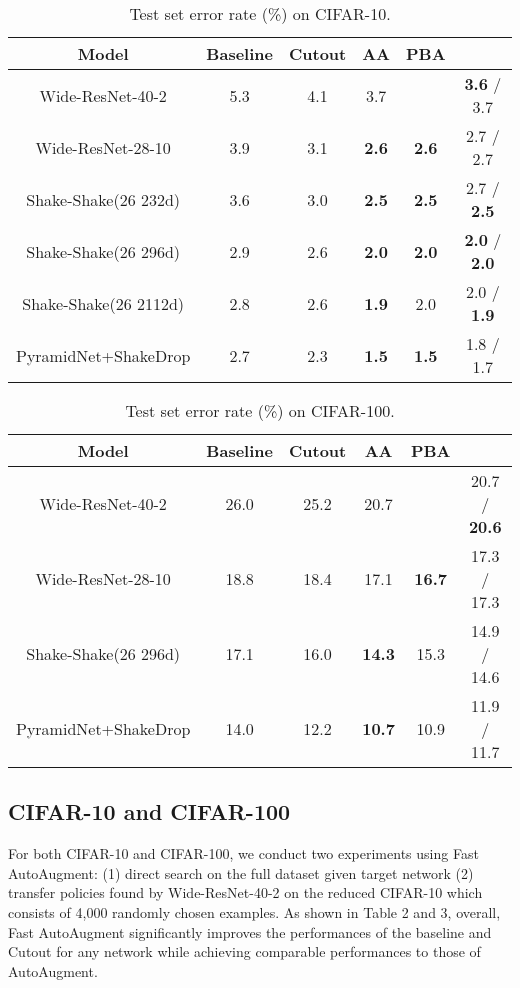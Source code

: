 \documentclass{article}
\begin{document}
\begin{table*}[t!] \center
\begin{tabular}{c | c c c c | c }
\toprule
Model & Baseline & Cutout \cite{devries2017cutout} & AA \cite{cubuk2018autoaugment} & PBA \cite{ho2019pba} &  
\tabularnewline
\midrule
Wide-ResNet-40-2 & 5.3 & 4.1 & 3.7 &  & \textbf{3.6} / 3.7 \\
Wide-ResNet-28-10 & 3.9 & 3.1 & {\bf 2.6} & \textbf{2.6} & 2.7 / 2.7 \\
Shake-Shake(26 232d) & 3.6 & 3.0 & {\bf 2.5} & \textbf{2.5} & 2.7 / \textbf{2.5} \\
Shake-Shake(26 296d) & 2.9 & 2.6 & {\bf 2.0} & \textbf{2.0} & \textbf{2.0} / {\bf 2.0} \\
Shake-Shake(26 2112d) & 2.8 & 2.6 & {\bf 1.9} & 2.0 & 2.0 / \textbf{1.9} \\
PyramidNet+ShakeDrop & 2.7 & 2.3 & {\bf 1.5} & \textbf{1.5} & 1.8 / 1.7
\tabularnewline
\bottomrule
\end{tabular}
\caption{Test set error rate (\%) on CIFAR-10.}
\label{table1:cifar10}
\end{table*}
\begin{table*}[t!] \center
\begin{tabular}{c | c c c c | c}
\toprule
Model & Baseline & Cutout \cite{devries2017cutout} & AA \cite{cubuk2018autoaugment} & PBA \cite{ho2019pba} &  
\tabularnewline
\midrule
Wide-ResNet-40-2 & 26.0 & 25.2 & 20.7 &  & 20.7 / \textbf{20.6} \\
Wide-ResNet-28-10 & 18.8 & 18.4 & 17.1 & \textbf{16.7} &  17.3 / 17.3 \\
Shake-Shake(26 296d) & 17.1 & 16.0 & {\bf 14.3} & 15.3 & 14.9 / 14.6 \\
PyramidNet+ShakeDrop & 14.0 & 12.2 & {\bf 10.7} & 10.9 & 11.9 / 11.7		
\tabularnewline
\bottomrule
\end{tabular}
\caption{Test set error rate (\%) on CIFAR-100.}
\label{table2:cifar100}
\end{table*}




\subsection{CIFAR-10 and CIFAR-100}
For both CIFAR-10 and CIFAR-100, we conduct two experiments using Fast AutoAugment: (1) direct search on the full dataset given target network (2) transfer policies found by Wide-ResNet-40-2 on the reduced CIFAR-10 which consists of 4,000 randomly chosen examples. As shown in Table 2 and 3, overall, Fast AutoAugment significantly improves the performances of the baseline and Cutout for any network while achieving comparable performances to those of AutoAugment.
\end{document}
